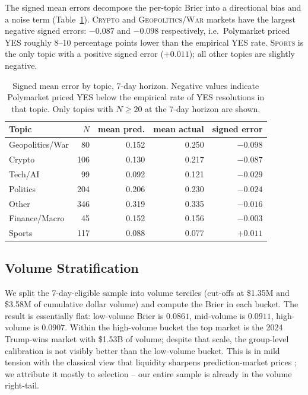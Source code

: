 \documentclass{article}
\begin{document}
The signed mean errors decompose the per-topic Brier into a directional
bias and a noise term (Table~\ref{tab:bias}). \textsc{Crypto} and
\textsc{Geopolitics/War} markets have the largest negative signed
errors: $-0.087$ and $-0.098$ respectively, i.e.\ Polymarket priced
YES roughly 8--10 percentage points lower than the empirical YES rate.
\textsc{Sports} is the only topic with a positive signed error
($+0.011$); all other topics are slightly negative.

\begin{table}[t]
  \centering
  \caption{Signed mean error by topic, 7-day horizon. Negative values
  indicate Polymarket priced YES below the empirical rate of YES
  resolutions in that topic. Only topics with $N \geq 20$ at the 7-day
  horizon are shown.}
  \label{tab:bias}
  \small
  \begin{tabular}{lrrrr}
    \toprule
    Topic & $N$ & mean pred. & mean actual & signed error \\
    \midrule
    Geopolitics/War  &  80 & 0.152 & 0.250 & $-0.098$ \\
    Crypto           & 106 & 0.130 & 0.217 & $-0.087$ \\
    Tech/AI          &  99 & 0.092 & 0.121 & $-0.029$ \\
    Politics         & 204 & 0.206 & 0.230 & $-0.024$ \\
    Other            & 346 & 0.319 & 0.335 & $-0.016$ \\
    Finance/Macro    &  45 & 0.152 & 0.156 & $-0.003$ \\
    Sports           & 117 & 0.088 & 0.077 & $+0.011$ \\
    \bottomrule
  \end{tabular}
\end{table}

\subsection{Volume Stratification}

We split the 7-day-eligible sample into volume terciles (cut-offs at
\$1.35M and \$3.58M of cumulative dollar volume) and compute the
Brier in each bucket. The result is essentially flat:
low-volume Brier is $0.0861$, mid-volume is $0.0911$, high-volume is
$0.0907$. Within the high-volume bucket the top market is the 2024
Trump-wins market with \$1.53B of volume; despite that scale, the
group-level calibration is not visibly better than the low-volume
bucket. This is in mild tension with the classical view that liquidity
sharpens prediction-market prices
\citep{wolfers2004prediction,page2013calibrated}; we attribute it
mostly to selection -- our entire sample is already in the volume
right-tail.
\end{document}
